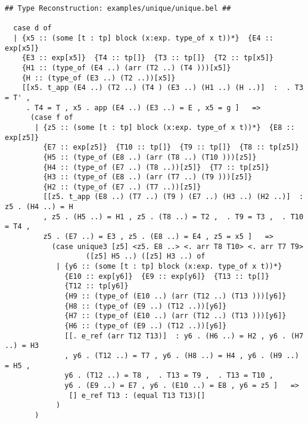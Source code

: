 \documentclass[12pt]{article}
\begin{document}
\footnotesize\begin{verbatim}
## Type Reconstruction: examples/unique/unique.bel ##

  case d of
  | {x5 :: (some [t : tp] block (x:exp. type_of x t))*}  {E4 :: exp[x5]}
    {E3 :: exp[x5]}  {T4 :: tp[]}  {T3 :: tp[]}  {T2 :: tp[x5]}
    {H1 :: (type_of (E4 ..) (arr (T2 ..) (T4 )))[x5]}
    {H :: (type_of (E3 ..) (T2 ..))[x5]}
    [[x5. t_app (E4 ..) (T2 ..) (T4 ) (E3 ..) (H1 ..) (H ..)]  :  . T3 = T' ,
     . T4 = T , x5 . app (E4 ..) (E3 ..) = E , x5 = g ]   =>
      (case f of
       | {z5 :: (some [t : tp] block (x:exp. type_of x t))*}  {E8 :: exp[z5]}
         {E7 :: exp[z5]}  {T10 :: tp[]}  {T9 :: tp[]}  {T8 :: tp[z5]}
         {H5 :: (type_of (E8 ..) (arr (T8 ..) (T10 )))[z5]}
         {H4 :: (type_of (E7 ..) (T8 ..))[z5]}  {T7 :: tp[z5]}
         {H3 :: (type_of (E8 ..) (arr (T7 ..) (T9 )))[z5]}
         {H2 :: (type_of (E7 ..) (T7 ..))[z5]}
         [[z5. t_app (E8 ..) (T7 ..) (T9 ) (E7 ..) (H3 ..) (H2 ..)]  : z5 . (H4 ..) = H
         , z5 . (H5 ..) = H1 , z5 . (T8 ..) = T2 ,  . T9 = T3 ,  . T10 = T4 ,
         z5 . (E7 ..) = E3 , z5 . (E8 ..) = E4 , z5 = x5 ]   =>
           (case unique3 [z5] <z5. E8 ..> <. arr T8 T10> <. arr T7 T9>
                   ([z5] H5 ..) ([z5] H3 ..) of
            | {y6 :: (some [t : tp] block (x:exp. type_of x t))*}
              {E10 :: exp[y6]}  {E9 :: exp[y6]}  {T13 :: tp[]}
              {T12 :: tp[y6]}
              {H9 :: (type_of (E10 ..) (arr (T12 ..) (T13 )))[y6]}
              {H8 :: (type_of (E9 ..) (T12 ..))[y6]}
              {H7 :: (type_of (E10 ..) (arr (T12 ..) (T13 )))[y6]}
              {H6 :: (type_of (E9 ..) (T12 ..))[y6]}
              [[. e_ref (arr T12 T13)]  : y6 . (H6 ..) = H2 , y6 . (H7 ..) = H3
              , y6 . (T12 ..) = T7 , y6 . (H8 ..) = H4 , y6 . (H9 ..) = H5 ,
              y6 . (T12 ..) = T8 ,  . T13 = T9 ,  . T13 = T10 ,
              y6 . (E9 ..) = E7 , y6 . (E10 ..) = E8 , y6 = z5 ]   =>
               [] e_ref T13 : (equal T13 T13)[]
            )
       )


\end{verbatim}
\end{document}
